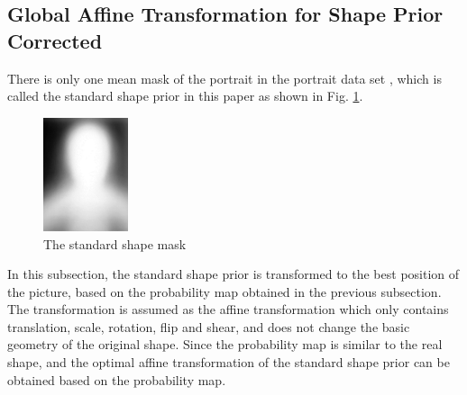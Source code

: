 \subsection{Global Affine Transformation for Shape Prior Corrected}\label{subsec: Global Affine Transformation for Shape Prior Corrected}
There is only one mean mask of the portrait in the portrait data set \cite{FCN:segmentation:shen2016automatic}, which is called the standard shape prior in this paper as shown in Fig. \ref{fig: The standard shape mask}.
\begin{figure}[ht]
    \centering
    \includegraphics[width = 2.5cm]{figs/meanmask}
    \caption{The standard shape mask}\label{fig: The standard shape mask}
\end{figure}
In this subsection, the standard shape prior is transformed to the best position of the picture, based on the probability map obtained in the previous subsection. The transformation is assumed as the affine transformation which only contains translation, scale, rotation, flip and shear, and does not change the basic geometry of the original shape. Since the probability map is similar to the real shape, and the optimal affine transformation of the standard shape prior can be obtained based on the probability map.

